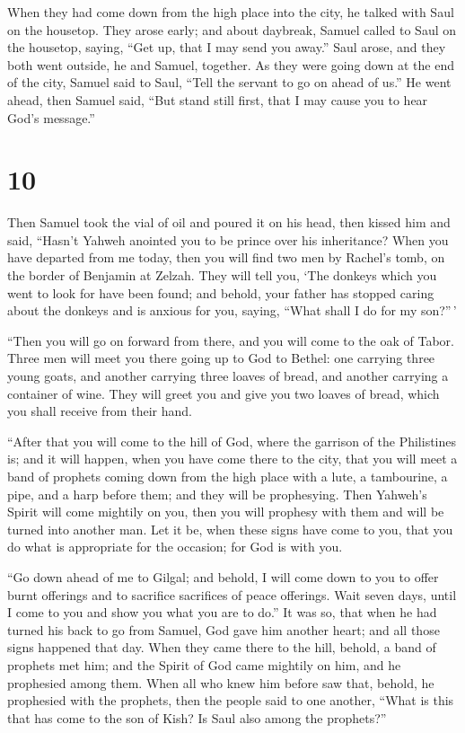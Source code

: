  When they had come down from the high place into the
city, he talked with Saul on the housetop.  They arose
early; and about daybreak, Samuel called to Saul on the housetop,
saying, ``Get up, that I may send you away.'' Saul arose, and they both
went outside, he and Samuel, together.  As they were
going down at the end of the city, Samuel said to Saul, ``Tell the
servant to go on ahead of us.'' He went ahead, then Samuel said, ``But
stand still first, that I may cause you to hear God's message.''

\hypertarget{section-9}{%
\section{10}\label{section-9}}

 Then Samuel took the vial of oil and poured it on his
head, then kissed him and said, ``Hasn't Yahweh anointed you to be
prince over his inheritance?  When you have departed from
me today, then you will find two men by Rachel's tomb, on the border of
Benjamin at Zelzah. They will tell you, `The donkeys which you went to
look for have been found; and behold, your father has stopped caring
about the donkeys and is anxious for you, saying, ``What shall I do for
my son?''\,'

 ``Then you will go on forward from there, and you will
come to the oak of Tabor. Three men will meet you there going up to God
to Bethel: one carrying three young goats, and another carrying three
loaves of bread, and another carrying a container of wine.
 They will greet you and give you two loaves of bread,
which you shall receive from their hand.

 ``After that you will come to the hill of God, where the
garrison of the Philistines is; and it will happen, when you have come
there to the city, that you will meet a band of prophets coming down
from the high place with a lute, a tambourine, a pipe, and a harp before
them; and they will be prophesying.  Then Yahweh's Spirit
will come mightily on you, then you will prophesy with them and will be
turned into another man.  Let it be, when these signs have
come to you, that you do what is appropriate for the occasion; for God
is with you.

 ``Go down ahead of me to Gilgal; and behold, I will come
down to you to offer burnt offerings and to sacrifice sacrifices of
peace offerings. Wait seven days, until I come to you and show you what
you are to do.''  It was so, that when he had turned his
back to go from Samuel, God gave him another heart; and all those signs
happened that day.  When they came there to the hill,
behold, a band of prophets met him; and the Spirit of God came mightily
on him, and he prophesied among them.  When all who knew
him before saw that, behold, he prophesied with the prophets, then the
people said to one another, ``What is this that has come to the son of
Kish? Is Saul also among the prophets?''

